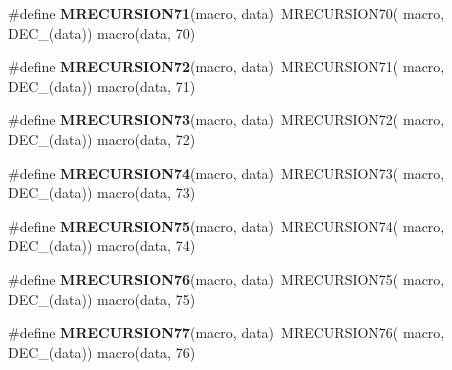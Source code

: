 \begin{DoxyCompactItemize}
\item 
\hypertarget{group__group__sam0__utils__mrecursion_ga53ea6fd4218fb470ef74e2e6ded573db}{}\#define {\bfseries M\+R\+E\+C\+U\+R\+S\+I\+O\+N71}(macro,  data)~M\+R\+E\+C\+U\+R\+S\+I\+O\+N70(  macro, D\+E\+C\+\_\+(data))   macro(data, 70)\label{group__group__sam0__utils__mrecursion_ga53ea6fd4218fb470ef74e2e6ded573db}

\item 
\hypertarget{group__group__sam0__utils__mrecursion_gaa07d3566091f78000fae05cf0e83c5b3}{}\#define {\bfseries M\+R\+E\+C\+U\+R\+S\+I\+O\+N72}(macro,  data)~M\+R\+E\+C\+U\+R\+S\+I\+O\+N71(  macro, D\+E\+C\+\_\+(data))   macro(data, 71)\label{group__group__sam0__utils__mrecursion_gaa07d3566091f78000fae05cf0e83c5b3}

\item 
\hypertarget{group__group__sam0__utils__mrecursion_ga186bc5d8359651d36b5ddcf03f37d334}{}\#define {\bfseries M\+R\+E\+C\+U\+R\+S\+I\+O\+N73}(macro,  data)~M\+R\+E\+C\+U\+R\+S\+I\+O\+N72(  macro, D\+E\+C\+\_\+(data))   macro(data, 72)\label{group__group__sam0__utils__mrecursion_ga186bc5d8359651d36b5ddcf03f37d334}

\item 
\hypertarget{group__group__sam0__utils__mrecursion_ga8335acfacb3b7c1519b263cc873db045}{}\#define {\bfseries M\+R\+E\+C\+U\+R\+S\+I\+O\+N74}(macro,  data)~M\+R\+E\+C\+U\+R\+S\+I\+O\+N73(  macro, D\+E\+C\+\_\+(data))   macro(data, 73)\label{group__group__sam0__utils__mrecursion_ga8335acfacb3b7c1519b263cc873db045}

\item 
\hypertarget{group__group__sam0__utils__mrecursion_ga224592c63d7b6799bab984a528ae4cc6}{}\#define {\bfseries M\+R\+E\+C\+U\+R\+S\+I\+O\+N75}(macro,  data)~M\+R\+E\+C\+U\+R\+S\+I\+O\+N74(  macro, D\+E\+C\+\_\+(data))   macro(data, 74)\label{group__group__sam0__utils__mrecursion_ga224592c63d7b6799bab984a528ae4cc6}

\item 
\hypertarget{group__group__sam0__utils__mrecursion_gad42e6fecb9cedc9b4038fc3096c34bcd}{}\#define {\bfseries M\+R\+E\+C\+U\+R\+S\+I\+O\+N76}(macro,  data)~M\+R\+E\+C\+U\+R\+S\+I\+O\+N75(  macro, D\+E\+C\+\_\+(data))   macro(data, 75)\label{group__group__sam0__utils__mrecursion_gad42e6fecb9cedc9b4038fc3096c34bcd}

\item 
\hypertarget{group__group__sam0__utils__mrecursion_gab51a9540134b976571d7ed113a047711}{}\#define {\bfseries M\+R\+E\+C\+U\+R\+S\+I\+O\+N77}(macro,  data)~M\+R\+E\+C\+U\+R\+S\+I\+O\+N76(  macro, D\+E\+C\+\_\+(data))   macro(data, 76)\label{group__group__sam0__utils__mrecursion_gab51a9540134b976571d7ed113a047711}


\end{DoxyCompactItemize}
